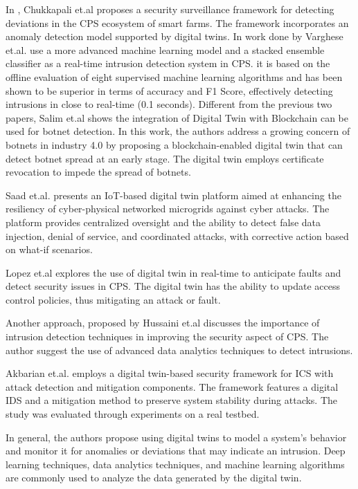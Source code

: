 In \cite{chukkapalliCyberPhysicalSystemSecurity2021}, Chukkapali et.al proposes a security surveillance framework for detecting deviations in the CPS ecosystem of smart farms. The framework incorporates an anomaly detection model supported by digital twins. In work done by Varghese et.al.\cite{vargheseDigitalTwinbasedIntrusion2022} use a more advanced machine learning model and a stacked ensemble classifier as a real-time intrusion detection system in CPS. it is based on the offline evaluation of eight supervised machine learning algorithms and has been shown to be superior in terms of accuracy and F1 Score, effectively detecting intrusions in close to real-time (0.1 seconds). Different from the previous two papers, Salim et.al \cite{salimBlockchainEnabledSecureDigital2022}shows the integration of Digital Twin with Blockchain can be used for botnet detection. In this work, the authors address a growing concern of botnets in industry 4.0 by proposing a blockchain-enabled digital twin that can detect botnet spread at an early stage. The digital twin employs certificate revocation to impede the spread of botnets.  

 Saad et.al.\cite{saadImplementationIoTBasedDigital2020} presents an IoT-based digital twin platform aimed at enhancing the resiliency of cyber-physical networked microgrids against cyber attacks. The platform provides centralized oversight and the ability to detect false data injection, denial of service, and coordinated attacks, with corrective action based on what-if scenarios.  
 
 Lopez et.al\cite{lopezDIGITALTWINSINTELLIGENT2021} explores the use of digital twin in real-time to anticipate faults and detect security issues in CPS. The digital twin has the ability to update access control policies, thus mitigating an attack or fault.  
 
 Another approach, proposed by Hussaini et.al \cite{hussainiTaxonomySecurityDefense2022} discusses the importance of intrusion detection techniques in improving the security aspect of CPS. The author suggest the use of advanced data analytics techniques to detect intrusions.  
 
 Akbarian et.al.\cite{akbarianSecurityFrameworkDigital2021} employs a digital twin-based security framework for ICS with attack detection and mitigation components. The framework features a digital IDS and a mitigation method to preserve system stability during attacks. The study was evaluated through experiments on a real testbed.  

In general, the authors propose using digital twins to model a system's behavior and monitor it for anomalies or deviations that may indicate an intrusion. Deep learning techniques\cite{williamdanilczykANGELIntelligentDigital2019}, data analytics techniques\cite{hussainiTaxonomySecurityDefense2022}, and machine learning algorithms\cite{williamdanilczykANGELIntelligentDigital2019, chukkapalliCyberPhysicalSystemSecurity2021, vargheseDigitalTwinbasedIntrusion2022} are commonly used to analyze the data generated by the digital twin.

